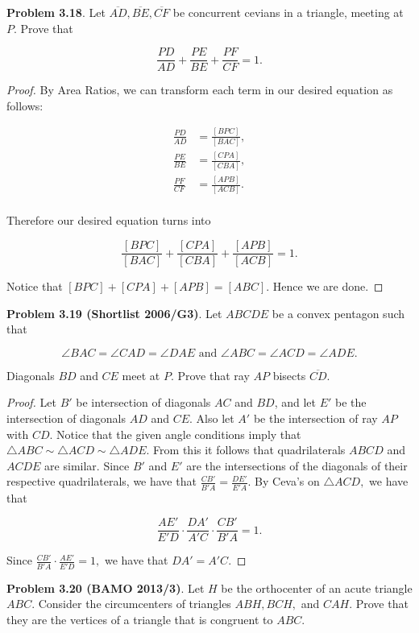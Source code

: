 \documentclass[letterpaper,oneside]{book}
\begin{document}
  \textbf{Problem 3.18}.   Let $\overline{AD}, \overline{BE}, \overline{CF}$ be concurrent cevians in a triangle, meeting at $P$. Prove that 

$$\frac{PD}{AD} + \frac{PE}{BE} + \frac{PF}{CF} = 1.$$

 \begin{proof}  By Area Ratios, we can transform each term in our desired equation as follows:

\begin{align*}
  \frac{PD}{AD} &= \frac{[BPC]}{[BAC]}, \\
  \frac{PE}{BE} &= \frac{[CPA]}{[CBA]}, \\
  \frac{PF}{CF} &= \frac{[APB]}{[ACB]}. \\
\end{align*}

Therefore our desired equation turns into

$$\frac{[BPC]}{[BAC]} + \frac{[CPA]}{[CBA]} +\frac{[APB]}{[ACB]} = 1.$$

Notice that $[{BPC}] + [{CPA}] + [{APB}] = [{ABC}].$ Hence we are done. \end{proof} 



 \textbf{Problem 3.19 (Shortlist 2006/G3)}.   Let $ABCDE$ be a convex pentagon such that 

$$\angle BAC = \angle CAD = \angle DAE \text{  and   } \angle ABC = \angle ACD = \angle ADE. $$

Diagonals $BD$ and $CE$ meet at $P$. Prove that ray $AP$ bisects $\overline{CD}$.

 \begin{proof}  Let $B'$ be intersection of diagonals $AC$ and $BD$, and let $E'$ be the intersection of diagonals $AD$ and $CE$. Also let $A'$ be the intersection of ray $AP$ with $CD.$ Notice that the given angle conditions imply that $\triangle ABC \sim \triangle ACD \sim \triangle ADE.$ From this it follows that quadrilaterals $ABCD$ and $ACDE$ are similar. Since $B'$ and $E'$ are the intersections of the diagonals of their respective quadrilaterals, we have that $\frac{CB'}{B'A} = \frac{DE'}{E'A}.$ By Ceva's on $\triangle ACD,$ we have that

$$\frac{AE'}{E'D}\cdot\frac{DA'}{A'C}\cdot\frac{CB'}{B'A} = 1.$$

Since $\frac{CB'}{B'A}\cdot\frac{AE'}{E'D} = 1,$ we have that $DA' = A'C.$ \end{proof}



  \textbf{Problem 3.20 (BAMO 2013/3)}.   Let $H$ be the orthocenter of an acute triangle $ABC$. Consider the circumcenters of triangles $ABH, BCH,$ and $CAH.$ Prove that they are the vertices of a triangle that is congruent to $ABC.$
\end{document}
